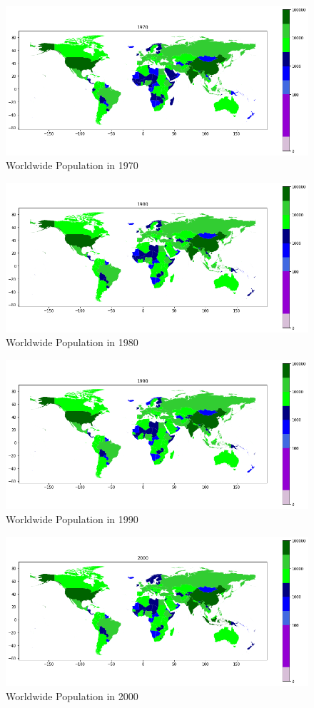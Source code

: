 \documentclass[a4paper, 11pt]{article}
\begin{document}
\begin{figure}[h!]
    \centering
    \includegraphics[width=0.9 \textwidth]{Images_Q2/1970.png}
    \caption{Worldwide Population in 1970}
    \label{fig:figure8}
\end{figure}
\newpage
\begin{figure}[h!]
    \centering
    \includegraphics[width=0.9 \textwidth]{Images_Q2/1980.png}
    \caption{Worldwide Population in 1980}
    \label{fig:figure9}
\end{figure}
\begin{figure}[h!]
    \centering
    \includegraphics[width=0.9 \textwidth]{Images_Q2/1990.png}
    \caption{Worldwide Population in 1990}
    \label{fig:figure10}
\end{figure}
\newpage
\begin{figure}[h!]
    \centering
    \includegraphics[width=0.9 \textwidth]{Images_Q2/2000.png}
    \caption{Worldwide Population in 2000}
    \label{fig:figure11}
\end{figure}
\end{document}
